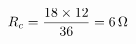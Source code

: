 \documentclass[preview]{standalone}
\begin{document}
\begin{align*}
\special{dvisvgm:raw <g id='unique000'>}R_c = \frac{18 \times 12}{36} = 6\,\Omega\special{dvisvgm:raw </g>}
\end{align*}
\end{document}

